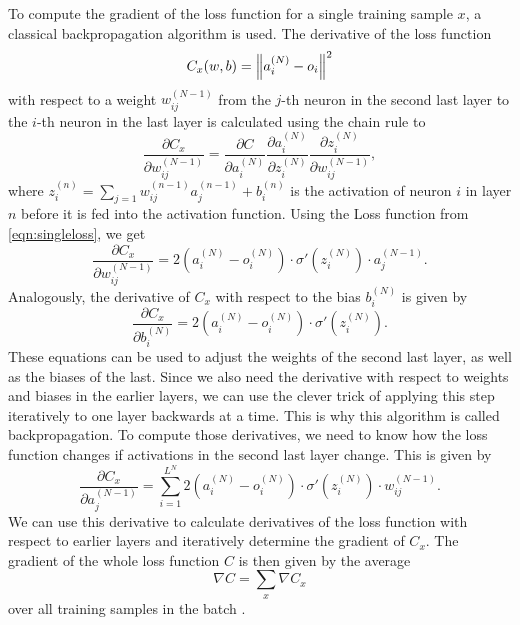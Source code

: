 To compute the gradient of the loss function for a single training sample $x$, a classical backpropagation algorithm is used. The derivative of the loss function
\begin{equation}
  \label{eqn:singleloss}
  C_x(w, b) = \left\lVert a_i^{(N)}-o_i\right\rVert^2
\end{equation}
with respect to a weight $w_{ij}^{(N-1)}$ from the $j$-th neuron in the second last layer to the $i$-th neuron in the last layer is calculated using the chain rule to
\begin{equation}
  \frac{\partial C_x}{\partial w_{ij}^{(N-1)}} = \frac{\partial C}{\partial a_i^{(N)}}\frac{\partial a_i^{(N)}}{\partial z_i^{(N)}} \frac{\partial z_i^{(N)}}{\partial w_{ij}^{(N-1)}},
\end{equation}
where $z_i^{(n)} = \sum_{j=1} w_{ij}^{(n-1)}a_j^{(n-1)}+b_i^{(n)}$ is the activation of neuron $i$ in layer $n$ before it is fed into the activation function. Using the Loss function from \eqref{eqn:singleloss}, we get
\begin{equation}
  \frac{\partial C_x}{\partial w_{ij}^{(N-1)}} = 2(a_i^{(N)}-o_i^{(N)}) \cdot \sigma'(z_i^{(N)}) \cdot a_j^{(N-1)}.
\end{equation}
Analogously, the derivative of $C_x$ with respect to the bias $b_i^{(N)}$ is given by
\begin{equation}
  \frac{\partial C_x}{\partial b_i^{(N)}} = 2(a_i^{(N)}-o_i^{(N)}) \cdot \sigma'(z_i^{(N)}).
\end{equation}
These equations can be used to adjust the weights of the second last layer, as well as the biases of the last. Since we also need the derivative with respect to weights and biases in the earlier layers, we can use the clever trick of applying this step iteratively to one layer backwards at a time. This is why this algorithm is called backpropagation. To compute those derivatives, we need to know how the loss function changes if activations in the second last layer change. This is given by
\begin{equation}
  \frac{\partial C_x}{\partial a_j^{(N-1)}} =\sum_{i=1}^{L^{N}} 2(a_i^{(N)}-o_i^{(N)}) \cdot \sigma'(z_i^{(N)}) \cdot w_{ij}^{(N-1)}.
\end{equation}
We can use this derivative to calculate derivatives of the loss function with respect to earlier layers and iteratively determine the gradient of $C_x$. The gradient of the whole loss function $C$ is then given by the average
\begin{equation}
  \nabla C = \sum_{x} \nabla C_x
\end{equation}
over all training samples in the batch \cite{nielsen}.

